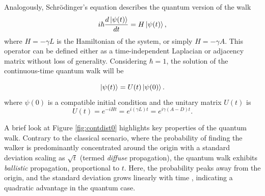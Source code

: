 \documentclass[../../main.tex]{subfiles}
\begin{document}
Analogously, Schrödinger's equation describes the quantum version of the walk 
\begin{equation}
	i\hbar \frac{d\ket{\psi(t)}}{dt} = H \ket{\psi(t)}, \label{shrodinger}
\end{equation}
where $H = -\gamma L$ is the Hamiltonian of the system, or simply $H = -\gamma
A$. This operator can be defined either as a time-independent Laplacian or
adjacency matrix without loss of generality. Considering $\hbar = 1$, the
solution of the continuous-time quantum walk will be 

\begin{equation}
	\ket{\psi(t)} = U(t)\ket{\psi(0)}.
    \label{eq:ctqwSystemEvolution}
\end{equation}
where $\psi(0)$ is a compatible initial condition and the unitary matrix $U(t)$
is
\begin{equation}
	U(t) = e^{-iHt} = e^{i(\gamma L)t} = e^{i\gamma(A-D)t}.
    \label{eq:contSimulUniOp}
\end{equation}

A brief look at Figure \ref{fig:contdist0} highlights key properties of the
quantum walk. Contrary to the classical scenario, where the probability of
finding the walker is predominantly concentrated around the origin with a
standard deviation scaling as $\sqrt{t}$ (termed \textit{diffuse} propagation),
the quantum walk exhibits \textit{ballistic} propagation, proportional to $t$. Here, the probability
peaks away from the origin, and the standard deviation grows linearly with time
\cite{childs2002}, indicating a quadratic advantage in the quantum case.

\end{document}
